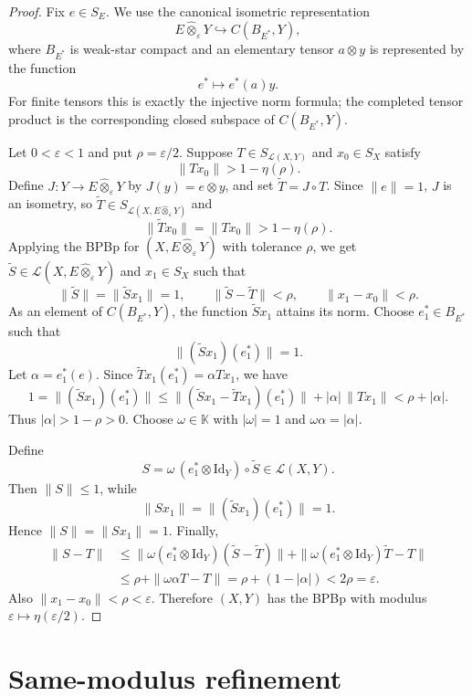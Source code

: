 \documentclass[11pt]{article}
\newcommand{\K}{\mathbb K}
\newcommand{\eps}{\varepsilon}
\newcommand{\ot}{\widehat{\otimes}_{\varepsilon}}
\begin{document}
\begin{proof}
Fix $e\in S_E$.  We use the canonical isometric representation
\[
 E\ot Y \hookrightarrow C(B_{E^\ast},Y),
\]
where $B_{E^\ast}$ is weak-star compact and an elementary tensor
$a\otimes y$ is represented by the function
\[
 e^\ast\longmapsto e^\ast(a)y .
\]
For finite tensors this is exactly the injective norm formula; the completed
tensor product is the corresponding closed subspace of $C(B_{E^\ast},Y)$.

Let $0<\eps<1$ and put $\rho=\eps/2$.  Suppose
$T\in S_{\mathcal L(X,Y)}$ and $x_0\in S_X$ satisfy
\[
 \|Tx_0\|>1-\eta(\rho).
\]
Define $J:Y\to E\ot Y$ by $J(y)=e\otimes y$, and set
$\widetilde T=J\circ T$.  Since $\|e\|=1$, $J$ is an isometry, so
$\widetilde T\in S_{\mathcal L(X,E\ot Y)}$ and
\[
 \|\widetilde T x_0\|=\|Tx_0\|>1-\eta(\rho).
\]
Applying the BPBp for $(X,E\ot Y)$ with tolerance $\rho$, we get
$\widetilde S\in\mathcal L(X,E\ot Y)$ and $x_1\in S_X$ such that
\[
 \|\widetilde S\|=\|\widetilde Sx_1\|=1,\qquad
 \|\widetilde S-\widetilde T\|<\rho,\qquad
 \|x_1-x_0\|<\rho .
\]
As an element of $C(B_{E^\ast},Y)$, the function $\widetilde Sx_1$ attains
its norm.  Choose $e_1^\ast\in B_{E^\ast}$ such that
\[
 \|(\widetilde Sx_1)(e_1^\ast)\|=1.
\]
Let $\alpha=e_1^\ast(e)$.  Since
$\widetilde T x_1(e_1^\ast)=\alpha Tx_1$, we have
\[
 1=\|(\widetilde Sx_1)(e_1^\ast)\|
 \leq \|(\widetilde Sx_1-\widetilde T x_1)(e_1^\ast)\|
      +|\alpha|\,\|Tx_1\|
 < \rho+|\alpha|.
\]
Thus $|\alpha|>1-\rho>0$.  Choose $\omega\in\K$ with $|\omega|=1$ and
$\omega\alpha=|\alpha|$.

Define
\[
 S=\omega\,(e_1^\ast\otimes \mathrm{Id}_Y)\circ \widetilde S
 \in\mathcal L(X,Y).
\]
Then $\|S\|\leq 1$, while
\[
 \|Sx_1\|=\|(\widetilde Sx_1)(e_1^\ast)\|=1.
\]
Hence $\|S\|=\|Sx_1\|=1$.  Finally,
\[
\begin{aligned}
\|S-T\|
&\leq
\|\omega(e_1^\ast\otimes \mathrm{Id}_Y)(\widetilde S-\widetilde T)\|
  +\|\omega(e_1^\ast\otimes \mathrm{Id}_Y)\widetilde T-T\|  \\
&\leq \rho+\|\omega\alpha T-T\|
 = \rho+(1-|\alpha|)
 <2\rho
 =\eps .
\end{aligned}
\]
Also $\|x_1-x_0\|<\rho<\eps$.  Therefore $(X,Y)$ has the BPBp with modulus
$\eps\mapsto \eta(\eps/2)$.
\end{proof}

\section*{Same-modulus refinement}
\end{document}
